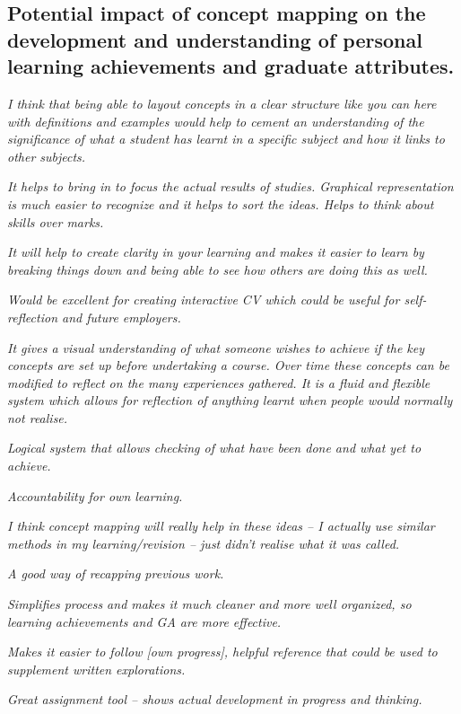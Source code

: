 
\subsection{Potential impact of concept mapping on the development and
understanding of personal learning achievements and graduate attributes.}

\textit{I think that being able to layout concepts in a clear structure like
you can here with definitions and examples would help to cement an understanding
of the significance of what a student has learnt in a specific subject and how
it links to other subjects.}

\textit{It helps to bring in to focus the actual results of studies.
Graphical representation is much easier to recognize and it helps to sort the
ideas. Helps to think about skills over marks.}

\textit{It will help to create clarity in your learning and makes it easier
to learn by breaking things down and being able to see how others are doing this
as well.}

\textit{Would be excellent for creating interactive CV which could be useful
for self-reflection and future employers.}

\textit{It gives a visual understanding of what someone wishes to achieve if the
key concepts are set up before undertaking a course. Over time these concepts can be
modified to reflect on the many experiences gathered. It is a fluid and flexible
system which allows for reflection of anything learnt when people would normally
not realise.}

\textit{Logical system that allows checking of what have been done and what yet
to achieve.} 

\textit{Accountability for own learning.}

\textit{I think concept mapping will really help in these ideas -- I actually
use similar methods in my learning/revision -- just didn't realise what it was
called.}

\textit{A good way of recapping previous work.}

\textit{Simplifies process and makes it much cleaner and more well organized, so
learning achievements and GA are more effective.}

\textit{Makes it easier to follow [own progress], helpful reference that could
be used to supplement written explorations.}

\textit{Great assignment tool -- shows actual development in progress and
thinking.}

